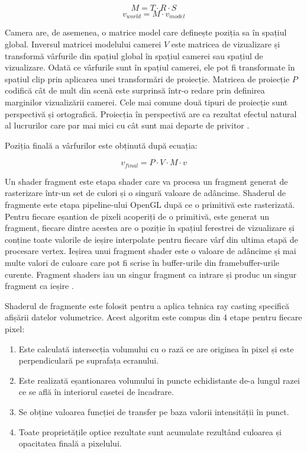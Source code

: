\begin{equation}
    M = T \cdot R \cdot S
\end{equation}
\begin{equation}
    v_{world} = M \cdot v_{model}
\end{equation}

Camera are, de asemenea, o matrice model care definește poziția sa în spațiul global. Inversul matricei modelului camerei $V$ este matricea de vizualizare și transformă vârfurile din spațiul global în spațiul camerei sau spațiul de vizualizare.
Odată ce vârfurile sunt în spațiul camerei, ele pot fi transformate în spațiul clip prin aplicarea unei transformări de proiecție. Matricea de proiecție $P$ codifică cât de mult din scenă este surprinsă într-o redare prin definirea marginilor vizualizării camerei. Cele mai comune două tipuri de proiecție sunt perspectivă și ortografică. Proiecția în perspectivă are ca rezultat efectul natural al lucrurilor care par mai mici cu cât sunt mai departe de privitor \cite{LearnOpenGL}. 

Poziția finală a vârfurilor este obținută după ecuația:

\begin{equation}
    v_{final} = P \cdot V \cdot M \cdot v 
\end{equation}

Un shader fragment este etapa shader care va procesa un fragment generat de rasterizare într-un set de culori și o singură valoare de adâncime. Shaderul de fragmente este etapa pipeline-ului OpenGL după ce o primitivă este rasterizată. Pentru fiecare eșantion de pixeli acoperiți de o primitivă, este generat un fragment, fiecare dintre acestea are o poziție în spațiul ferestrei de vizualizare și conține toate valorile de ieșire interpolate pentru fiecare vârf din ultima etapă de procesare vertex. Ieșirea unui fragment shader este o valoare de adâncime și mai multe valori de culoare care pot fi scrise în buffer-urile din framebuffer-urile curente. Fragment shaders iau un singur fragment ca intrare și produc un singur fragment ca ieșire \cite{LearnOpenGL}. 

Shaderul de fragmente este folosit pentru a aplica tehnica ray casting specifică afișării datelor volumetrice. Acest algoritm este compus din 4 etape pentru fiecare pixel:

\begin{enumerate}
    \item Este calculată intersecția volumului cu o rază ce are originea în pixel și este perpendiculară pe suprafața ecranului.
    \item Este realizată eșantionarea volumului în puncte echidistante de-a lungul razei ce se află în interiorul casetei de încadrare.
    \item Se obține valoarea funcției de transfer pe baza valorii intensității în punct.
    \item Toate proprietățile optice rezultate sunt acumulate rezultând culoarea și opacitatea finală a pixelului.
\end{enumerate}

